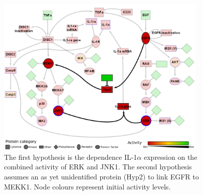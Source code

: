 \documentclass{bmcart}
\begin{document}
\def\largeModelScale{0.18}%
\def\legendScalaColori{0.21}%
\def\legendScalaForme{0.21}%
\def\scalaGrafici{0.0709}%
\begin{figure}[!tpb]
\begin{minipage}{\textwidth}
\centering
  \includegraphics[width=0.9\textwidth]{Figures/S9}
\caption{
The first hypothesis is the dependence IL-1$\alpha$ expression on the
combined activity of ERK and JNK1. The second hypothesis assumes an as yet unidentified protein (Hyp2) to link EGFR to MEKK1.
Node colours represent initial activity levels.}\label{fig:large-model-hypotheses}
\end{minipage}
\end{figure}
\end{document}
